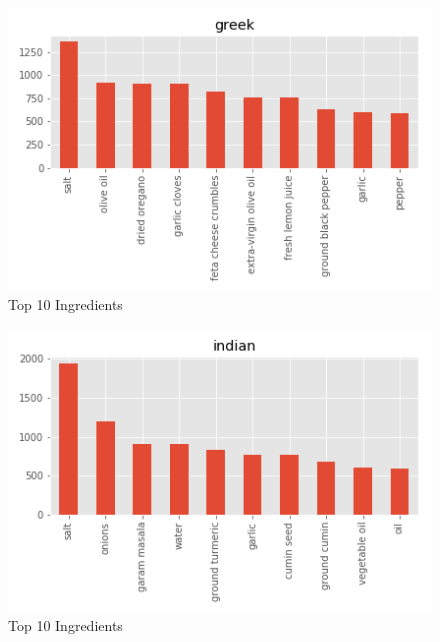\documentclass[sigconf]{acmart}
\begin{document}
\begin{figure}[!ht]
  \centering\includegraphics[width=\columnwidth]{images/greek_10_most_used_ingredients.png}
  \caption{Top 10 Ingredients }\label{f:greek_10_most_used_ingredients}
\end{figure}

\begin{figure}[!ht]
  \centering\includegraphics[width=\columnwidth]{images/indian_10_most_used_ingredients.png}
  \caption{Top 10 Ingredients }\label{f:indian_10_most_used_ingredients}
\end{figure}
\end{document}
